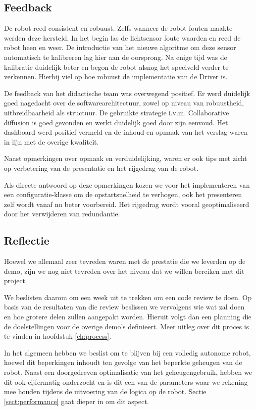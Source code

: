 \documentclass[12pt,a4paper]{report}
\begin{document}
\subsection{Feedback}

De robot reed consistent en robuust. Zelfs wanneer de robot fouten maakte werden deze hersteld. In het begin las de lichtsensor foute waarden en reed de robot heen en weer. De introductie van het nieuwe algoritme om deze sensor automatisch te kalibreren lag hier aan de oorsprong. Na enige tijd was de kalibratie duidelijk beter en begon de robot alsnog het speelveld verder te verkennen. Hierbij viel op hoe robuust de implementatie van de Driver is.

De feedback van het didactische team was overwegend positief. Er werd duidelijk goed nagedacht over de softwarearchitectuur, zowel op niveau van robuustheid, uitbreidbaarheid als structuur. De gebruikte strategie i.v.m. Collaborative diffusion is goed gevonden en werkt duidelijk goed door zijn eenvoud. Het dashboard werd positief vermeld en de inhoud en opmaak van het verslag waren in lijn met de overige kwaliteit.

Naast opmerkingen over opmaak en verduidelijking, waren er ook tips met zicht op verbetering van de presentatie en het rijgedrag van de robot.

Als directe antwoord op deze opmerkingen kozen we voor het implementeren van een configuratie-klasse om de opstartsnelheid te verhogen, ook het presenteren zelf wordt vanaf nu beter voorbereid. Het rijgedrag wordt vooral geoptimaliseerd door het verwijderen van redundantie.

\subsection{Reflectie}

Hoewel we allemaal zeer tevreden waren met de prestatie die we leverden op de demo, zijn we nog niet tevreden over het niveau dat we willen bereiken met dit project.

We beslisten daarom om een week uit te trekken om een code review te doen. Op basis van de resultaten van die review beslissen we vervolgens wie wat zal doen en hoe grotere delen zullen aangepakt worden. Hieruit volgt dan een planning die de doelstellingen voor de overige demo's definieert. Meer uitleg over dit proces is te vinden in hoofdstuk \ref{ch:process}.

In het algemeen hebben we beslist om te blijven bij een volledig autonome robot, hoewel dit beperkingen inhoudt ten gevolge van het beperkte geheugen van de robot. Naast een doorgedreven optimalisatie van het geheugengebruik, hebben we dit ook cijfermatig onderzocht en is dit een van de parameters waar we rekening mee houden tijdens de uitvoering van de logica op de robot. Sectie \ref{sect:performance} gaat dieper in om dit aspect.
\end{document}
